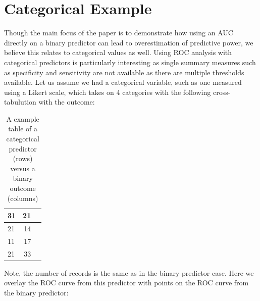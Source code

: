 \documentclass[article]{jss}
\begin{document}
\hypertarget{categorical-example}{%
\section{Categorical Example}\label{categorical-example}}

Though the main focus of the paper is to demonstrate how using an AUC
directly on a binary predictor can lead to overestimation of predictive
power, we believe this relates to categorical values as well. Using ROC
analysis with categorical predictors is particularly interesting as
single summary measures such as specificity and sensitivity are not
available as there are multiple thresholds available. Let us assume we
had a categorical variable, such as one measured using a Likert scale,
which takes on 4 categories with the following cross-tabulution with the
outcome:

\begin{CodeChunk}
\begin{table}[ht]

\caption{\label{tab:create_cat_tab_output}A example table of a categorical predictor (rows) versus a binary outcome (columns)}
\centering
\begin{tabular}{l|r|r}
\hline
31 & 21\\
\hline
21 & 14\\
\hline
11 & 17\\
\hline
21 & 33\\
\hline
\end{tabular}
\end{table}

\end{CodeChunk}

Note, the number of records is the same as in the binary predictor case.
Here we overlay the ROC curve from this predictor with points on the ROC
curve from the binary predictor:
\end{document}
